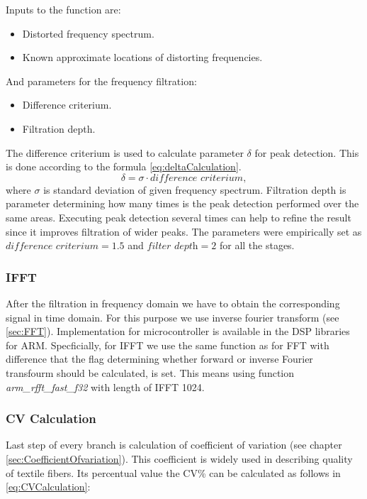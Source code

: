 \documentclass[twoside]{ctuthesis}
\theoremstyle{plain}
\theoremstyle{definition}
\theoremstyle{note}
\begin{document}
Inputs to the function are:
\begin{itemize}
	\setlength{\itemsep}{5pt}
	\item Distorted frequency spectrum.
	\item Known approximate locations of distorting frequencies.
\end{itemize}
And parameters for the frequency filtration:
\begin{itemize}
	\setlength{\itemsep}{5pt}
	\item Difference criterium.
	\item Filtration depth.
\end{itemize}
The difference criterium is used to calculate parameter $\delta$ for peak detection. This is done according to the formula \ref{eq:deltaCalculation}.
\begin{equation} \label{eq:deltaCalculation}
	\delta = \sigma \cdot \textit{difference criterium},
\end{equation}
where $\sigma$ is standard deviation of given frequency spectrum.
Filtration depth is parameter determining how many times is the peak detection performed over the same areas. Executing peak detection several times can help to refine the result since it improves filtration of wider peaks. The parameters were empirically set as $\textit{difference criterium}=1.5$ and $\textit{filter depth} = 2$ for all the stages.

\subsubsection{IFFT}
After the filtration in frequency domain we have to obtain the corresponding signal in time domain. For this purpose we use inverse fourier transform (see \ref{sec:FFT}). Implementation for microcontroller is available in the DSP libraries for ARM. Specficially, for IFFT we use the same function as for FFT with difference that the flag determining whether forward or inverse Fourier transfourm should be calculated, is set. This means using function \textit{arm\_rfft\_fast\_f32} with length of IFFT 1024.

\subsubsection{CV Calculation}
Last step of every branch is calculation of coefficient of variation (see chapter \ref{sec:CoefficientOfvariation}). This coefficient is widely used in describing quality of textile fibers. Its percentual value the CV\% can be calculated as follows in \ref{eq:CVCalculation}:
\end{document}
